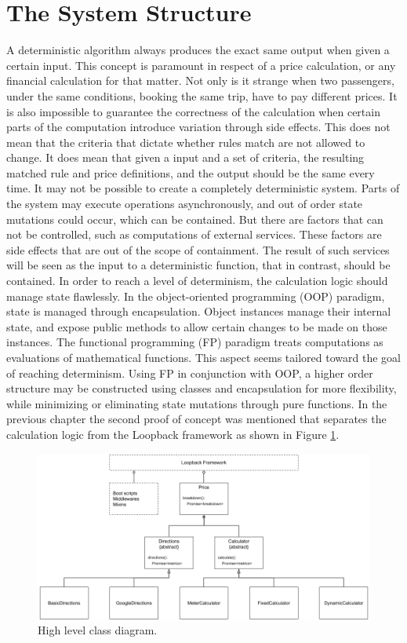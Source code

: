 \section{The System Structure}
A deterministic algorithm always produces the exact same output when given a certain input. This concept is paramount in respect of a price calculation, or any financial calculation for that matter. Not only is it strange when two passengers, under the same conditions, booking the same trip, have to pay different prices. It is also impossible to guarantee the correctness of the calculation when certain parts of the computation introduce variation through side effects. This does not mean that the criteria that dictate whether rules match are not allowed to change. It does mean that given a input and a set of criteria, the resulting matched rule and price definitions, and the output should be the same every time. It may not be possible to create a completely deterministic system. Parts of the system may execute operations asynchronously, and out of order state mutations could occur, which can be contained. But there are factors that can not be controlled, such as computations of external services. These factors are side effects that are out of the scope of containment. The result of such services will be seen as the input to a deterministic function, that in contrast, should be contained. In order to reach a level of determinism, the calculation logic should manage state flawlessly. In the object-oriented programming (OOP) paradigm, state is managed through encapsulation. Object instances manage their internal state, and expose public methods to allow certain changes to be made on those instances. The functional programming (FP) paradigm treats computations as evaluations of mathematical functions. This aspect seems tailored toward the goal of reaching determinism. Using FP in conjunction with OOP, a higher order structure may be constructed using classes and encapsulation for more flexibility, while minimizing or eliminating state mutations through pure functions. In the previous chapter the second proof of concept was mentioned that separates the calculation logic from the Loopback framework as shown in Figure \ref{fig:Class Diagram}.

\begin{figure}[H]
	\centering
	\includegraphics[width=1\textwidth]{ClassDiagram}
	\caption[Class Diagram]{High level class diagram.}
	\label{fig:Class Diagram}
\end{figure}

